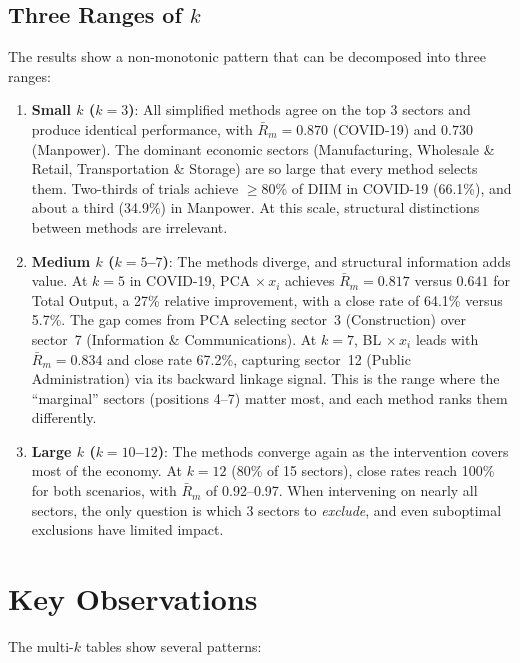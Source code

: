 \subsection{Three Ranges of $k$}

The results show a non-monotonic pattern that can be decomposed into three ranges:

\begin{enumerate}
    \item \textbf{Small $k$ ($k = 3$)}: All simplified methods agree on the top 3 sectors and produce identical performance, with $\bar{R}_m = 0.870$ (COVID-19) and $0.730$ (Manpower). The dominant economic sectors (Manufacturing, Wholesale \& Retail, Transportation \& Storage) are so large that every method selects them. Two-thirds of trials achieve $\geq$80\% of DIIM in COVID-19 (66.1\%), and about a third (34.9\%) in Manpower. At this scale, structural distinctions between methods are irrelevant.

    \item \textbf{Medium $k$ ($k = 5$--$7$)}: The methods diverge, and structural information adds value. At $k = 5$ in COVID-19, PCA $\times\, x_i$ achieves $\bar{R}_m = 0.817$ versus $0.641$ for Total Output, a 27\% relative improvement, with a close rate of 64.1\% versus 5.7\%. The gap comes from PCA selecting sector~3 (Construction) over sector~7 (Information \& Communications). At $k = 7$, BL $\times\, x_i$ leads with $\bar{R}_m = 0.834$ and close rate 67.2\%, capturing sector~12 (Public Administration) via its backward linkage signal. This is the range where the ``marginal'' sectors (positions 4--7) matter most, and each method ranks them differently.

    \item \textbf{Large $k$ ($k = 10$--$12$)}: The methods converge again as the intervention covers most of the economy. At $k = 12$ (80\% of 15 sectors), close rates reach 100\% for both scenarios, with $\bar{R}_m$ of 0.92--0.97. When intervening on nearly all sectors, the only question is which 3 sectors to \emph{exclude}, and even suboptimal exclusions have limited impact.
\end{enumerate}


\section{Key Observations}

The multi-$k$ tables show several patterns:

